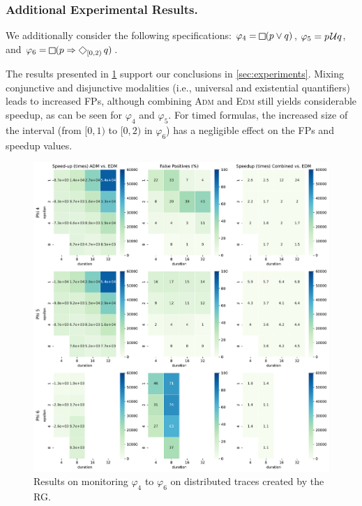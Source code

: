 \subsubsection*{Additional Experimental Results.}


We additionally consider the following specifications:
$\varphi_4 = \LTLg (p \lor q)$, $\varphi_5 = p \kern.1em\mathcal{U} q$, and $\varphi_6 = \LTLg (p \Rightarrow \LTLf_{[0,2)} q)$.

The results presented in \cref{fig:rgresults2} support our conclusions in \cref{sec:experiments}.
Mixing conjunctive and disjunctive modalities (i.e., universal and existential quantifiers) leads to increased FPs, although combining \textsc{Adm} and \textsc{Edm} still yields considerable speedup, as can be seen for $\varphi_4$ and $\varphi_5$.
For timed formulas, the increased size of the interval (from $[0,1)$ to $[0,2)$ in $\varphi_6$) has a negligible effect on the FPs and speedup values.

\begin{figure}[h]
	\begin{center}
		\includegraphics[width=\linewidth]{speedup_appendix}
		\caption{Results on monitoring $\varphi_{4}$ to $\varphi_{6}$ on distributed traces created by the RG.}
		\label{fig:rgresults2}
	\end{center}
	\vspace{1em}
\end{figure}
